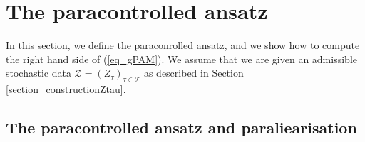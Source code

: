 \documentclass[11pt]{preprint}
\newcommand{\mcZ}{\mathcal{Z}}
\newcommand{\mcT}{\mathcal{T}}
\def\eqref#1{(\ref{#1})}
\begin{document}
	
	
	
	
	
	
	
	
	
	
	
	
	\section{The paracontrolled ansatz} \label{section_ParacAnsatz}
	
	In this section, we define the paraconrolled ansatz, and we show how to compute the right hand side of \eqref{eq_gPAM}. We assume that we are given an admissible stochastic data $\mcZ=(Z_\tau)_{\tau\in \mcT}$ as described in Section \ref{section_constructionZtau}. 
	
	
	
	\subsection{The paracontrolled ansatz and paraliearisation}
	
\end{document}
